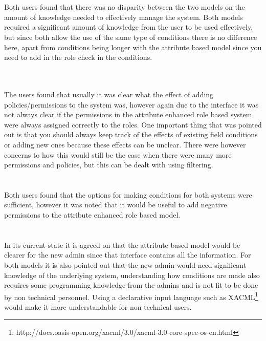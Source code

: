 \textbf{ }
\\
\\
Both users found that there was no disparity between the two models on the amount of knowledge needed to effectively manage the system.
Both models required a significant amount of knowledge from the user to be used effectively, but since both allow the use of the same type of conditions there is no difference here, apart from conditions being longer with the attribute based model since you need to add in the role check in the conditions.

\textbf{ }
\\
\\
The users found that usually it was clear what the effect of adding policies/permissions to the system was, however again due to the interface it was not always clear if the permissions in the attribute enhanced role based system were always assigned correctly to the roles.
One important thing that was pointed out is that you should always keep track of the effects of existing field conditions or adding new ones because these effects can be unclear.
There were however concerns to how this would still be the case when there were many more permissions and policies, but this can be dealt with using filtering.
\\

\textbf{ }
\\
\\
Both users found that the options for making conditions for both systems were sufficient, however it was noted that it would be useful to add negative permissions to the attribute enhanced role based model.
\\

\textbf{ }
\\
\\
In its current state it is agreed on that the attribute based model would be clearer for the new admin since that interface contains all the information.
For both models it is also pointed out that the new admin would need significant knowledge of the underlying system, understanding how conditions are made also requires some programming knowledge from the admins and is not fit to be done by non technical personnel.
Using a declarative input language such as XACML\footnote{http://docs.oasis-open.org/xacml/3.0/xacml-3.0-core-spec-os-en.html} would make it more understandable for non technical users.
\\

